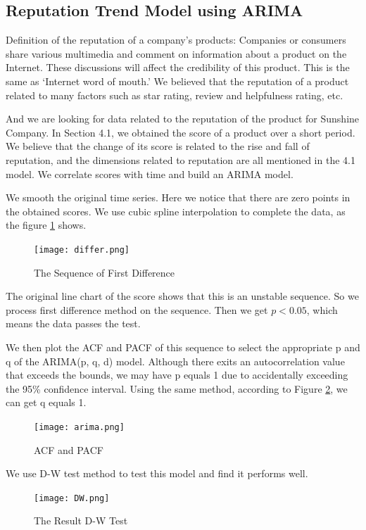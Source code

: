 \documentclass[12pt]{article}  %
\begin{document}
\subsection{Reputation Trend Model using ARIMA}
Definition of the reputation of a company's products:
Companies or consumers share various multimedia and comment on information about a product on the Internet. These discussions will affect the credibility of this product. This is the same as `Internet word of mouth.' We believed that the reputation of a product related to many factors such as star rating, review and helpfulness rating, etc.

And we are looking for data related to the reputation of the product for Sunshine Company. In Section 4.1, we obtained the score of a product over a short period. We believe that the change of its score is related to the rise and fall of reputation, and the dimensions related to reputation are all mentioned in the 4.1 model. We correlate scores with time and build an ARIMA model. 

We smooth the original time series. Here we notice that there are zero points in the obtained scores. We use cubic spline interpolation to complete the data, as the figure \ref{fig:fig8} shows.

\begin{figure}[htbp]
	\centering
	\texttt{[image: differ.png]}
	\caption{The Sequence of First Difference}\label{fig:fig8}
\end{figure}

The original line chart of the score shows that this is an unstable sequence. So we process first difference method on the sequence. Then we get  $p< 0.05$, which means the data passes the test.

We then plot the ACF and PACF of this sequence to select the appropriate p and q of the ARIMA(p, q, d) model. Although there exits an autocorrelation value that exceeds the bounds, we may have p equals 1 due to accidentally exceeding the 95\% confidence interval. Using the same method, according to Figure \ref{fig:fig10}, we can get q equals 1.

\begin{figure}[htbp]
	\centering
	\texttt{[image: arima.png]}
	\caption{ACF and PACF}\label{fig:fig10}
\end{figure}

We use D-W test method to test this model and find it performs well.

\begin{figure}[htbp]
	\centering
	\texttt{[image: DW.png]}
	\caption{The Result D-W Test}\label{fig:fig11}
\end{figure}
\end{document}
